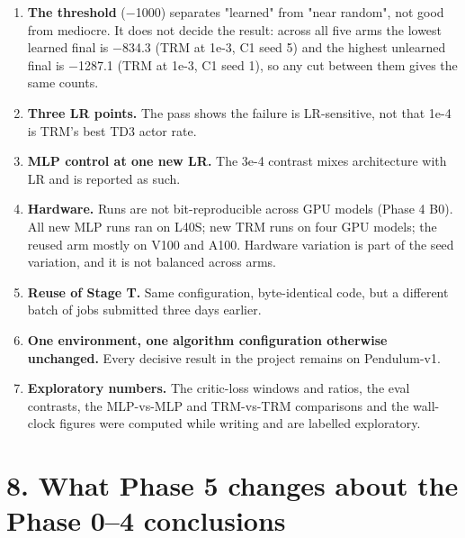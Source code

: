 \documentclass[11pt]{article}
\begin{document}
\begin{enumerate}
\item \textbf{The threshold} ($-$1000) separates "learned" from "near random", not good from mediocre. It does not decide the result: across all five arms the lowest learned final is $-$834.3 (TRM at 1e-3, C1 seed 5) and the highest unlearned final is $-$1287.1 (TRM at 1e-3, C1 seed 1), so any cut between them gives the same counts.
\item \textbf{Three LR points.} The pass shows the failure is LR-sensitive, not that 1e-4 is TRM's best TD3 actor rate.
\item \textbf{MLP control at one new LR.} The 3e-4 contrast mixes architecture with LR and is reported as such.
\item \textbf{Hardware.} Runs are not bit-reproducible across GPU models (Phase 4 B0). All new MLP runs ran on L40S; new TRM runs on four GPU models; the reused arm mostly on V100 and A100. Hardware variation is part of the seed variation, and it is not balanced across arms.
\item \textbf{Reuse of Stage T.} Same configuration, byte-identical code, but a different batch of jobs submitted three days earlier.
\item \textbf{One environment, one algorithm configuration otherwise unchanged.} Every decisive result in the project remains on Pendulum-v1.
\item \textbf{Exploratory numbers.} The critic-loss windows and ratios, the eval contrasts, the MLP-vs-MLP and TRM-vs-TRM comparisons and the wall-clock figures were computed while writing and are labelled exploratory.
\end{enumerate}



\section*{8. What Phase 5 changes about the Phase 0--4 conclusions}
\end{document}
